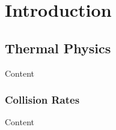 
\chapter{Introduction} %

\label{ch:intro} %


\section{Thermal Physics}

Content


\subsection{Collision Rates} \label{sec:colrates}

Content